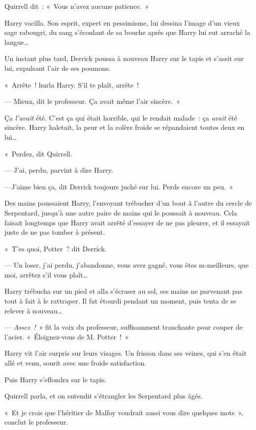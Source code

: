 Quirrell dit~: «~Vous n'avez aucune patience.~»

Harry vacilla.
Son esprit, expert en pessimisme, lui dessina l'image d'un vieux sage rabougri, du sang s'écoulant de sa bouche après que Harry lui eut arraché la langue…

Un instant plus tard, Derrick poussa à nouveau Harry sur le tapis et s'assit sur lui, expulsant l'air de ses poumons.

«~Arrête~! hurla Harry.
S'il te plaît, arrête~!

--- Mieux, dit le professeur. Ça avait même l'air sincère.~»

Ça \emph{l'avait} été.
C'est ça qui était horrible, qui le rendait malade~: ça \emph{avait} été sincère.
Harry haletait, la peur et la colère froide se répandaient toutes deux en lui…

«~Perdez, dit Quirrell.

--- J'ai, perdu, parvint à dire Harry.

---J'aime bien ça, dit Derrick toujours juché sur lui.
Perds encore un peu.~»

\later

Des mains poussaient Harry, l'envoyant trébucher d'un bout à l'autre du cercle de Serpentard, jusqu'à une autre paire de mains qui le poussait à nouveau.
Cela faisait longtemps que Harry avait arrêté d'essayer de ne pas pleurer, et il essayait juste de ne pas tomber à présent.

«~T'es quoi, Potter~? dit Derrick.

--- Un loser, j'ai perdu, j'abandonne, vous avez gagné, vous êtes m-meilleurs, que moi, arrêtez s'il vous plaît…

Harry trébucha sur un pied et alla s'écraser au sol, ses mains ne parvenant pas tout à fait à le rattraper.
Il fut étourdi pendant un moment, puis tenta de se relever à nouveau…

--- \emph{Assez~!}~» fit la voix du professeur, suffisamment tranchante pour couper de l'acier.
«~Éloignez-vous de M. Potter~!~»

Harry vit l'air surpris sur leurs visages.
Un frisson dans ses veines, qui s'en était allé et venu, sourit avec une froide satisfaction.

Puis Harry s'effondra sur le tapis.

Quirrell parla, et on entendit s'étrangler les Serpentard plus âgés.

«~Et je crois que l'héritier de Malfoy voudrait aussi vous dire quelques mots~», conclut le professeur.

